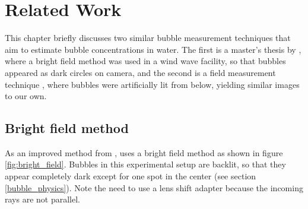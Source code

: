 
\chapter{Related Work} \label{related_work}
 

This chapter briefly discusses two similar bubble measurement techniques that aim to estimate bubble concentrations in water. The first is a master's thesis by \citet{Leonie}, where a bright field method was used in a wind wave facility, so that bubbles appeared as dark circles on camera, and the second is a field measurement technique \citep{Al-Lashi2016}, where bubbles were artificially lit from below, yielding similar images to our own. 

\section{Bright field method}
	As an improved method from \citet{MischlerDiss}, \citet{Leonie} uses a bright field method as shown in figure \ref{fig:bright_field}. Bubbles in this experimental setup are backlit, so that they appear completely dark except for one spot in the center (see section  \ref{bubble_physics}). Note the need to use a lens shift adapter because the incoming rays are not parallel. 
	
